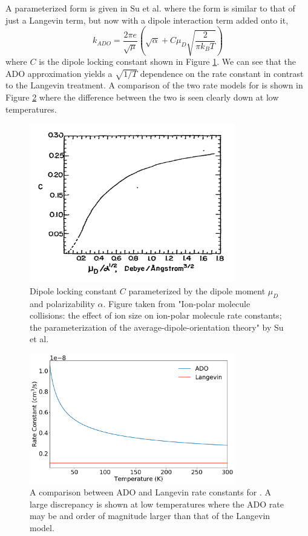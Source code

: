 A parameterized form is given in Su et al. where the form is similar to that of just a Langevin term, but now with a dipole interaction term added onto it,
\begin{equation}
    k_{ADO} = \frac{2 \pi e}{\sqrt{\mu}}\left(\sqrt{\alpha}+C \mu_D\sqrt{\frac{2}{\pi k_B T}}\right)
    \label{eq: k ADO}
\end{equation}
where $C$ is the dipole locking constant shown in Figure \ref{fig: C}.\cite{Su1973a}\cite{Troe1985} We can see that the ADO approximation yields a $\sqrt{1/T}$ dependence on the rate constant in contrast to the Langevin treatment. A comparison of the two rate models for  is shown in Figure \ref{fig: ADO Langevin} where the difference between the two is seen clearly down at low temperatures.

\begin{figure}[H]
	\label{fig: C}
	\centering
	\includegraphics[width=0.8\textwidth]{images/ADO_C.pdf}
	\caption{Dipole locking constant $C$ parameterized by the dipole moment $\mu_D$ and polarizability $\alpha$. Figure taken from "Ion-polar molecule collisions: the effect of ion size on ion-polar molecule rate constants; the parameterization of the average-dipole-orientation theory" by Su et al.\cite{Su1973a}}
\end{figure}

\begin{figure}[H]
	\centering
	\includegraphics[width=0.8\textwidth]{images/ADO_Langevin_compare.png}
	\caption{A comparison between ADO and Langevin rate constants for . A large discrepancy is shown at low temperatures where the ADO rate may be and order of magnitude larger than that of the Langevin model.}
	\label{fig: ADO Langevin}
\end{figure}


